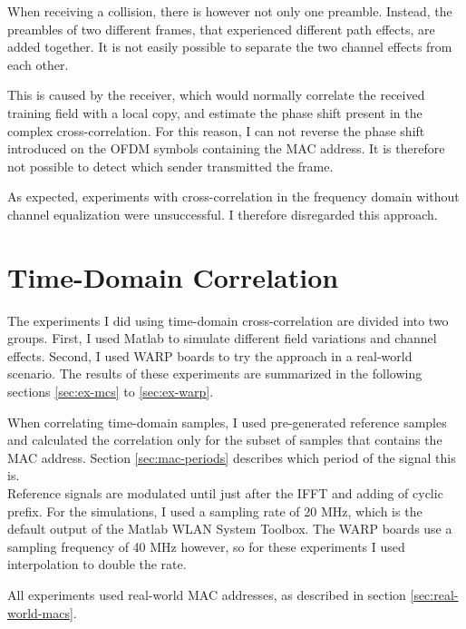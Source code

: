 When receiving a collision, there is however not only one preamble. Instead, the preambles of two different frames, that experienced different path effects, are added together. It is not easily possible to separate the two channel effects from each other.

This is caused by the receiver, which would normally correlate the received training field with a local copy, and estimate the phase shift present in the complex cross-correlation. For this reason, I can not reverse the phase shift introduced on the \gls{OFDM} symbols containing the \gls{MAC} address. It is therefore not possible to detect which sender transmitted the frame.

As expected, experiments with cross-correlation in the frequency domain without channel equalization were unsuccessful. I therefore disregarded this approach.



\section{Time-Domain Correlation}

The experiments I did using time-domain cross-correlation are divided into two groups. First, I used Matlab to simulate different field variations and channel effects. Second, I used WARP boards to try the approach in a real-world scenario. The results of these experiments are summarized in the following sections \ref{sec:ex-mcs} to \ref{sec:ex-warp}.

When correlating time-domain samples, I used pre-generated reference samples and calculated the correlation only for the subset of samples that contains the \gls{MAC} address. Section \ref{sec:mac-periods} describes which period of the signal this is.\\

Reference signals are modulated until just after the \gls{IFFT} and adding of cyclic prefix. For the simulations, I used a sampling rate of 20 MHz, which is the default output of the Matlab WLAN System Toolbox. The WARP boards use a sampling frequency of 40 MHz however, so for these experiments I used interpolation to double the rate.

All experiments used real-world \gls{MAC} addresses, as described in section \ref{sec:real-world-macs}.



